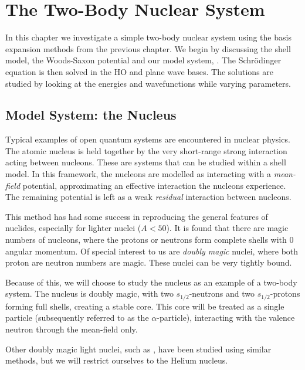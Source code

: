 \documentclass[../main/report.tex]{subfiles}
\begin{document}
  
\chapter{The Two-Body Nuclear System}
\label{cha:two-body}

In this chapter we investigate a simple two-body nuclear system using the basis expansion methods from the previous chapter.
We begin by discussing the shell model, the Woods-Saxon potential and our model system, . 
The Schrödinger equation is then solved in the HO and plane wave bases.
The solutions are studied by looking at the energies and wavefunctions while varying parameters.	

\section{Model System: the  Nucleus}
Typical examples of open quantum systems are encountered in nuclear physics. The atomic nucleus is held together by the very short-range strong interaction acting between nucleons. 
These are systems that can be studied within a shell model. 
In this framework, the nucleons are modelled as interacting with a \emph{mean-field} potential, approximating an effective interaction the nucleons experience. 
The remaining potential is left as a weak \emph{residual} interaction between nucleons. 

This method has had some success in reproducing the general features of nuclides\cite{suhonen}, especially for lighter nuclei ($A<50$). 
It is found that there are magic numbers of nucleons, where the protons or neutrons form complete shells with $0$ angular momentum. 
Of special interest to us are \emph{doubly magic} nuclei, where both proton are neutron numbers are magic. These nuclei can be very tightly bound.
 
Because of this, we will choose to study the  nucleus as an example of a two-body system. 
The  nucleus is doubly magic, with two $s_{1/2}$-neutrons and two $s_{1/2}$-protons forming full shells, creating a stable core. 
This core will be treated as a single particle (subsequently referred to as the $\alpha$-particle), interacting with the valence neutron through the mean-field only.

Other doubly magic light nuclei, such as , have been studied using similar methods\cite{gamow_shell_model_2008}, but we will restrict ourselves to the Helium nucleus. 
\end{document}
